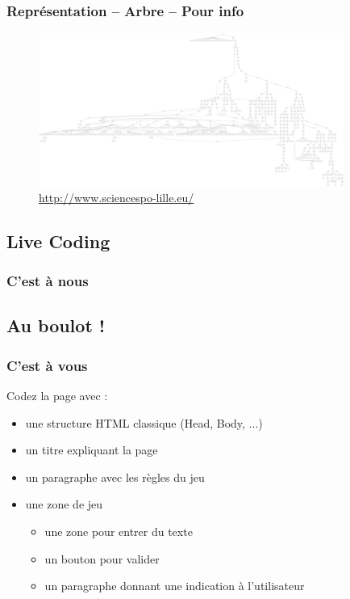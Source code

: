 \documentclass{beamer}
\begin{document}
	\begin{frame}
		\frametitle{Représentation -- Arbre -- Pour info}

		\begin{figure}
			\includegraphics[width=10cm]{images/page_acceuil_sciences_po_dom.png}
			\caption{\url{http://www.sciencespo-lille.eu/}}	
		\end{figure}		
		
	\end{frame}	
	
	
	
	
	\subsection{Live Coding}
	\begin{frame}
		\frametitle{C'est à nous}
	\end{frame}

	
	\subsection{Au boulot !}
	\begin{frame}
		\frametitle{C'est à vous}
		Codez la page avec : 
		\begin{itemize}
			\item une structure HTML classique (Head, Body, ...)
			\item un titre expliquant la page
			\item un paragraphe avec les règles du jeu
			\item une zone de jeu
				\begin{itemize}
					\item une zone pour entrer du texte
					\item un bouton pour valider
					\item un paragraphe donnant une indication à l'utilisateur
				\end{itemize}
		\end{itemize}
	\end{frame}
\end{document}
